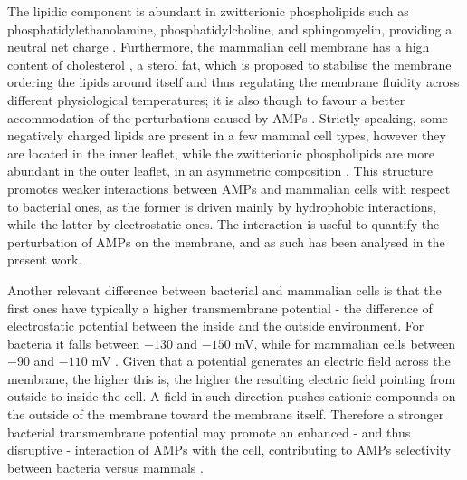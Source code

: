 The lipidic component is abundant in zwitterionic phospholipids such as phosphatidylethanolamine, phosphatidylcholine, and sphingomyelin, providing a neutral net charge \citep{Spector1985,vanMeer2008}.
%
Furthermore, the mammalian cell membrane has a high content of cholesterol \citep{Yeaman2003, Lai2009}, a sterol fat, which is proposed to stabilise the membrane ordering the lipids around itself and thus regulating the membrane fluidity across different physiological temperatures; it is also though to favour a better accommodation of the perturbations caused by AMPs \citep{Zasloff2002}.
%
Strictly speaking, some negatively charged lipids are present in a few mammal cell types, however they are located in the inner leaflet, while the zwitterionic phospholipids are more abundant in the outer leaflet, in an asymmetric composition \citep{vanMeer2008,Matsuzaki2009}.
%
This structure promotes weaker interactions between AMPs and mammalian cells with respect to bacterial ones, as the former is driven mainly by hydrophobic interactions, while the latter by electrostatic ones.
%
The interaction is useful to quantify the perturbation of AMPs on the membrane, and as such has been analysed in the present work.

Another relevant difference between bacterial and mammalian cells is that the first ones have typically a higher transmembrane potential - the difference of electrostatic potential between the inside and the outside environment. For bacteria it falls between $-130$ and $-150$ mV, while for mammalian cells between $-90$ and $-110$ mV \citep{Yeaman2003,Matsuzaki2009,Ebenhan2014}.
%
Given that a potential generates an electric field across the membrane, the higher this is, the higher the resulting electric field pointing from outside to inside the cell. A field in such direction pushes cationic compounds on the outside of the membrane toward the membrane itself. Therefore a stronger bacterial transmembrane potential may promote an enhanced - and thus disruptive - interaction of AMPs with the cell, contributing to AMPs selectivity between bacteria versus mammals \citep{Yeaman2003}.


